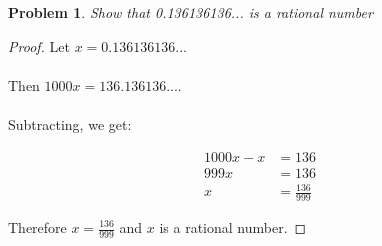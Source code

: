 \documentclass{article}
\newtheorem{problem}{Problem}
\begin{document}
\begin{problem}
Show that 0.136136136... is a rational number
\end{problem}

\begin{proof}
Let $x = 0.136136136...$ 
\\
\\
Then $1000x = 136.136136...$. 
\\
\\
Subtracting, we get:

\begin{align*}
1000x - x &= 136 \\
999x &= 136 \\
x &= \frac{136}{999}
\end{align*}

Therefore $x = \displaystyle \frac{136}{999}$ and $x$ is a rational number.
\end{proof}
\end{document}
